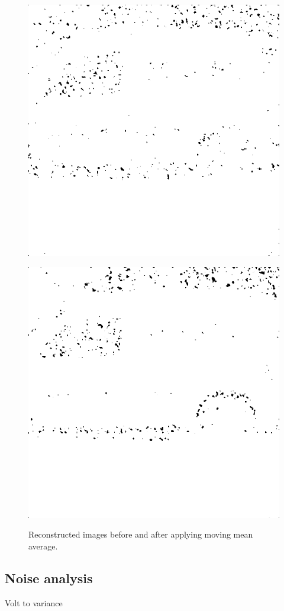 \begin{figure}[H]
\begin{minipage}[t]{0.49\textwidth}
\includegraphics[width = 1\linewidth]{result/luminance/24_512_m30.PNG}
	\subcaption{}
	\label{lc_bf}
\end{minipage}
\begin{minipage}[t]{0.49\textwidth}
\includegraphics[width = 1\linewidth]{gfx/car/car_m30.png}
	\subcaption{}
	\label{lc_af}
\end{minipage}
	\caption{Reconstructed images before and after applying moving mean average.}
	\label{fig:lc_image}
\end{figure}



\subsection{Noise analysis}
Volt to variance


